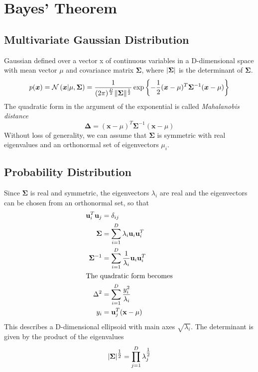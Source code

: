 \documentclass[11pt]{article}
\theoremstyle{definition}
\newcommand*\N[1]{\mathcal{N}\left(#1\right)}
\DeclarePairedDelimiter\abs{\lvert}{\rvert}
\DeclarePairedDelimiter\norm{\lVert}{\rVert}
\begin{document}
\section{Bayes' Theorem}
\subsection{Multivariate Gaussian Distribution}
Gaussian defined over a vector x of continuous variables in a D-dimensional space with mean vector $\mu$ and covariance matrix $\bm{\Sigma}$, where $ \abs{\bm{\Sigma}} $ is the determinant of $\bm{\Sigma}$.
\begin{equation*}
	p(\bm{x}) = \N{\bm{x}|\mu, \bm{\Sigma}} = \frac{1}{(2\pi)^{\frac{D}{2}} \norm{\bm{\Sigma}}^{\frac{1}{2}}} \exp\left\{ -\frac{1}{2} (\bm{x} - \mu)^T \bm{\Sigma}^{-1} (\bm{x} - \mu) \right\}
\end{equation*}
The quadratic form in the argument of the exponential is called \emph{Mahalanobis distance}
\begin{equation*}
	\bm{\Delta} = (\bm{x} - \mu)^T \bm{\Sigma}^{-1} (\bm{x} - \mu)
\end{equation*}
Without loss of generality, we can assume that $\bm{\Sigma}$ is symmetric with real eigenvalues and an orthonormal set of eigenvectors $\mu_i$.

\subsection{Probability Distribution}
Since $\bm{\Sigma}$ is real and symmetric, the eigenvectors $\lambda_i$ are real and the eigenvectors can be chosen from an orthonormal set, so that
\begin{align*}
	\textbf{u}_i^T \textbf{u}_j &= \delta_{ij}\\
	\bm{\Sigma} &= \sum_{i=1}^{D} \lambda_i \textbf{u}_i\textbf{u}_i^T\\
	\bm{\Sigma}^{-1} &= \sum_{i=1}^{D} \frac{1}{\lambda_i} \textbf{u}_i\textbf{u}_i^T\\
	\intertext{The quadratic form becomes}
	\Delta^2 &= \sum_{i=1}^{D}\frac{y_i^2}{\lambda_i}\\
	y_i &= \textbf{u}_j^T (\textbf{x} - \mu)
\end{align*}
This describes a D-dimensional ellipsoid with main axes $\sqrt{\lambda_i}$. The determinant is given by the product of the eigenvalues
\begin{equation*}
	\abs{\bm{\Sigma}}^{\tfrac{1}{2}} = \prod_{j=1}^{D} \lambda_j^{\tfrac{1}{2}}
\end{equation*}
\end{document}
